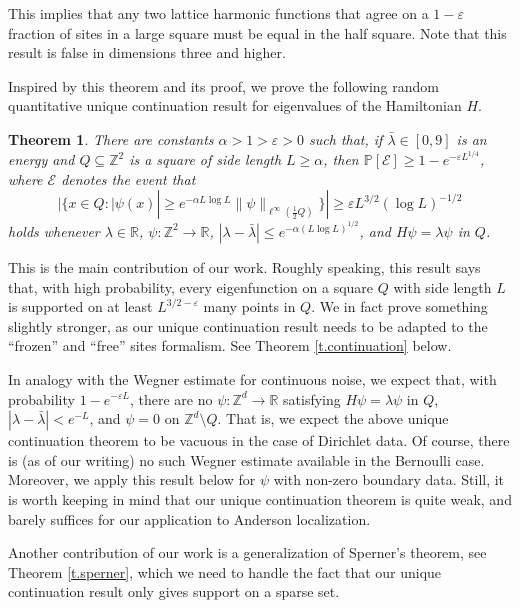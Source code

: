 \documentclass{amsart}
\newtheorem{theorem}[equation]{Theorem}
\newcommand{\tref}[1]{Theorem \ref{t.#1}}
\numberwithin{equation}{section}
\numberwithin{figure}{section}
\newcommand{\Z}{\mathbb{Z}}
\newcommand{\R}{\mathbb{R}}
\renewcommand{\P}{\mathbb{P}}
\newcommand{\ep}{\varepsilon}
\begin{document}
This implies that any two lattice harmonic functions that agree on a $1-\ep$ fraction of sites in a large square must be equal in the half square.  Note that this result is false in dimensions three and higher.

Inspired by this theorem and its proof, we prove the following random quantitative unique continuation result for eigenvalues of the Hamiltonian $H$.

\begin{theorem}
\label{t.introcontinuation}
There are constants $\alpha > 1 > \ep > 0$ such that, if $\bar \lambda \in [0,9]$ is an energy and $Q \subseteq \Z^2$ is a square of side length $L \geq \alpha$, then $\P[\mathcal E] \geq 1 - e^{-\ep L^{1/4}}$, where $\mathcal E$ denotes the event that
\begin{equation*}
| \{ x \in Q : |\psi(x)| \geq e^{-\alpha L \log L} \| \psi \|_{\ell^\infty(\frac12 Q)} \} | \geq \ep L^{3/2}(\log L)^{-1/2}
\end{equation*}
holds whenever $\lambda \in \R$, $\psi : \Z^2 \to \R$, $|\lambda - \bar \lambda| \leq e^{-\alpha (L \log L)^{1/2}}$, and $H \psi = \lambda \psi$ in $Q$.
\end{theorem}

This is the main contribution of our work.  Roughly speaking, this result says that, with high probability, every eigenfunction on a  square $Q$ with side length $L$ is supported on at least $L^{3/2-\ep}$ many points in $Q$. We in fact prove something slightly stronger, as our unique continuation result needs to be adapted to the ``frozen'' and ``free'' sites formalism.  See \tref{continuation} below.

In analogy with the Wegner estimate for continuous noise, we expect that, with probability $1 - e^{-\ep L}$, there are no $\psi : \Z^d \to \R$ satisfying $H \psi = \lambda \psi$ in $Q$, $|\lambda - \bar \lambda| < e^{-L}$, and $\psi = 0$ on $\Z^d \setminus Q$.  That is, we expect the above unique continuation theorem to be vacuous in the case of Dirichlet data.  Of course, there is (as of our writing) no such Wegner estimate available in the Bernoulli case.  Moreover, we apply this result below for $\psi$ with non-zero boundary data.  Still, it is worth keeping in mind that our unique continuation theorem is quite weak, and barely suffices for our application to Anderson localization.

Another contribution of our work is a generalization of Sperner's theorem, see \tref{sperner}, which we need to handle the fact that our unique continuation result only gives support on a sparse set.
\end{document}
